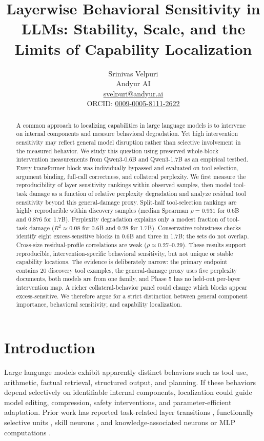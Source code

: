 \documentclass[10pt,twocolumn]{article}
\title{\textbf{Layerwise Behavioral Sensitivity in LLMs: Stability, Scale, and the Limits of Capability Localization}}
\author{Srinivas Velpuri\\Andyur AI\\\href{mailto:svelpuri@andyur.ai}{svelpuri@andyur.ai}\\ORCID: \href{https://orcid.org/0009-0005-8111-2622}{0009-0005-8111-2622}}
\date{}
\begin{document}
\maketitle

\begin{abstract}
A common approach to localizing capabilities in large language models is to intervene on internal components and measure behavioral degradation. Yet high intervention sensitivity may reflect general model disruption rather than selective involvement in the measured behavior. We study this question using preserved whole-block intervention measurements from Qwen3-0.6B and Qwen3-1.7B as an empirical testbed. Every transformer block was individually bypassed and evaluated on tool selection, argument binding, full-call correctness, and collateral perplexity. We first measure the reproducibility of layer sensitivity rankings within observed samples, then model tool-task damage as a function of relative perplexity degradation and analyze residual tool sensitivity beyond this general-damage proxy. Split-half tool-selection rankings are highly reproducible within discovery samples (median Spearman $\rho=0.931$ for 0.6B and $0.876$ for 1.7B). Perplexity degradation explains only a modest fraction of tool-task damage ($R^2\approx0.08$ for 0.6B and $0.28$ for 1.7B). Conservative robustness checks identify eight excess-sensitive blocks in 0.6B and three in 1.7B; the sets do not overlap. Cross-size residual-profile correlations are weak ($\rho\approx0.27$--$0.29$). These results support reproducible, intervention-specific behavioral sensitivity, but not unique or stable capability locations. The evidence is deliberately narrow: the primary endpoint contains 20 discovery tool examples, the general-damage proxy uses five perplexity documents, both models are from one family, and Phase 5 has no held-out per-layer intervention map. A richer collateral-behavior panel could change which blocks appear excess-sensitive. We therefore argue for a strict distinction between general component importance, behavioral sensitivity, and capability localization.
\end{abstract}

\section{Introduction}
Large language models exhibit apparently distinct behaviors such as tool use, arithmetic, factual retrieval, structured output, and planning. If these behaviors depend selectively on identifiable internal components, localization could guide model editing, compression, safety interventions, and parameter-efficient adaptation. Prior work has reported task-related layer transitions \cite{zhao2024layer}, functionally selective units \cite{alkhamissi2025llm}, skill neurons \cite{wang2022skill}, and knowledge-associated neurons or MLP computations \cite{dai2022knowledge,meng2022rome}.
\end{document}
